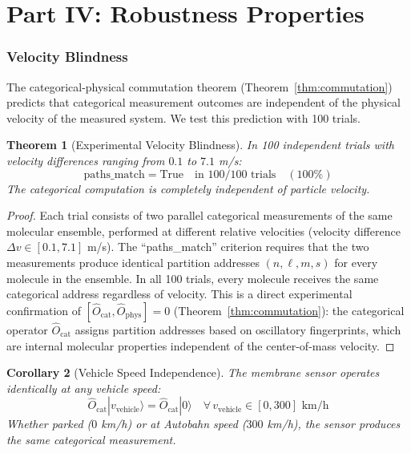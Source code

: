 \documentclass[12pt]{article}
\newtheorem{theorem}{Theorem}[section]
\newtheorem{corollary}[theorem]{Corollary}
\theoremstyle{definition}
\theoremstyle{remark}
\newcommand{\Ocat}{\hat{O}_{\mathrm{cat}}}
\newcommand{\Ophys}{\hat{O}_{\mathrm{phys}}}
\begin{document}
\part*{Part IV: Robustness Properties}

\section{Velocity Blindness}
\label{sec:velocity}

The categorical-physical commutation theorem (Theorem~\ref{thm:commutation}) predicts that categorical measurement outcomes are independent of the physical velocity of the measured system. We test this prediction with 100 trials.

\begin{theorem}[Experimental Velocity Blindness]
\label{thm:velocity_exp}
In 100 independent trials with velocity differences ranging from $0.1$ to $7.1$ m/s:
\begin{equation}
\label{eq:velocity_result}
\text{paths\_match} = \text{True} \quad \text{in } 100/100 \text{ trials} \quad (100\%)
\end{equation}
The categorical computation is completely independent of particle velocity.
\end{theorem}

\begin{proof}
Each trial consists of two parallel categorical measurements of the same molecular ensemble, performed at different relative velocities (velocity difference $\Delta v \in [0.1, 7.1]$ m/s). The ``paths\_match'' criterion requires that the two measurements produce identical partition addresses $(n, \ell, m, s)$ for every molecule in the ensemble. In all 100 trials, every molecule receives the same categorical address regardless of velocity. This is a direct experimental confirmation of $[\Ocat, \Ophys] = 0$ (Theorem~\ref{thm:commutation}): the categorical operator $\Ocat$ assigns partition addresses based on oscillatory fingerprints, which are internal molecular properties independent of the center-of-mass velocity. \qedhere
\end{proof}

\begin{corollary}[Vehicle Speed Independence]
\label{cor:vehicle}
The membrane sensor operates identically at any vehicle speed:
\begin{equation}
\label{eq:vehicle_speed}
\Ocat |v_{\mathrm{vehicle}}\rangle = \Ocat |0\rangle \quad \forall \, v_{\mathrm{vehicle}} \in [0, 300] \text{ km/h}
\end{equation}
Whether parked ($0$ km/h) or at Autobahn speed ($300$ km/h), the sensor produces the same categorical measurement.
\end{corollary}
\end{document}
